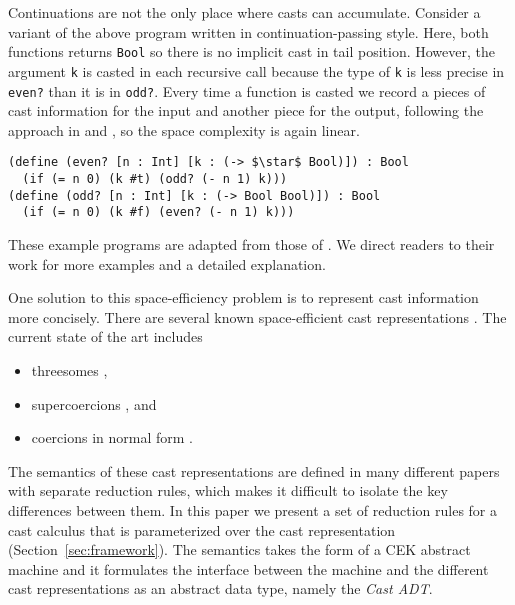 \documentclass[runningheads]{llncs}
\begin{document}
Continuations are not the only place where casts can accumulate.
Consider a variant of the above program written in
continuation-passing style.  Here, both functions returns
\lstinline|Bool| so there is no implicit cast in tail position.
However, the argument \lstinline|k| is casted in each
recursive call because the type of \lstinline|k| is less precise in
\lstinline|even?| than it is in \lstinline|odd?|. 
Every time a function is casted we record a pieces of
cast information for the input and another piece for
the output, following the approach in \cite{breazu1991inheritance}
and \cite{Breazu-Tannen:1990vc},
so the space complexity is again linear.
\begin{lstlisting}
(define (even? [n : Int] [k : (-> $\star$ Bool)]) : Bool
  (if (= n 0) (k #t) (odd? (- n 1) k)))
(define (odd? [n : Int] [k : (-> Bool Bool)]) : Bool
  (if (= n 0) (k #f) (even? (- n 1) k)))
\end{lstlisting}
These example programs are adapted from those of \cite{herman2010space}.
We direct readers to their work for more examples and a detailed explanation.

One solution to this space-efficiency problem is to represent cast
information more concisely. There are several known space-efficient
cast representations
\citep{Siek:2015:BCT:2737924.2737968,Siek:2010:TWB:1706299.1706342,Garcia:2013:CTB:2500365.2500603,kuhlenschmidt2018efficient,siek2012interpretations,garcia2014deriving}.
The current state of the art includes
\begin{itemize}
	\item threesomes 
	\citep{Siek:2010:TWB:1706299.1706342,Garcia:2013:CTB:2500365.2500603},
	\item supercoercions \citep{Garcia:2013:CTB:2500365.2500603}, and
	\item coercions in normal form
	\citep{siek2012interpretations,Siek:2015:BCT:2737924.2737968}.
\end{itemize}

The semantics of these cast representations are defined in many
different papers with separate reduction rules, which makes it
difficult to isolate the key differences between them.  In this paper
we present a set of reduction rules for a cast calculus that
is parameterized over the cast representation
(Section~\ref{sec:framework}).
The semantics takes the form of a CEK
abstract machine and it formulates the interface between the machine
and the different cast representations as an abstract data type,
namely the \emph{Cast ADT}.
\end{document}
